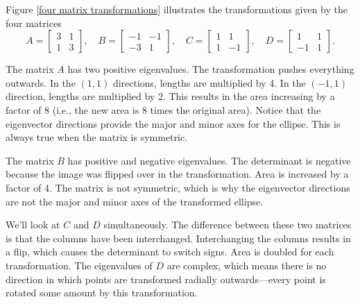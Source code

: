 \begin{example}\label{details for four}

Figure \ref{four matrix transformations} illustrates the transformations given by  the four matrices 
$$A = 
\begin{bmatrix}
3&1\\1&3
\end{bmatrix}
,\quad
B = 
\begin{bmatrix}
-1&-1\\-3&1
\end{bmatrix}
,\quad
C = 
\begin{bmatrix}
1&1\\1&-1
\end{bmatrix}
,\quad
D = 
\begin{bmatrix}
1&1\\-1&1
\end{bmatrix}
.$$ 

The matrix $A$ has two positive eigenvalues. The transformation pushes everything outwards.  In the $(1,1)$ directions, lengths are multiplied by 4.  In the $(-1,1)$ direction, lengths are multiplied by 2.  This results in the area increasing by a factor of 8 (i.e., the new area is 8 times the original area).  Notice that the eigenvector directions provide the major and minor axes for the ellipse.  This is always true when the matrix is symmetric.

The matrix $B$ has positive and negative eigenvalues.  The determinant is negative because the image was flipped over in the transformation.  Area is increased by a factor of 4.  The matrix is not symmetric, which is why the eigenvector directions are not the major and minor axes of the transformed ellipse.

We'll look at $C$ and $D$ simultaneously.  The difference between these two matrices is that the columns have been interchanged. Interchanging the columns results in a flip, which causes the determinant to switch signs. Area is doubled for each transformation.  The eigenvalues of $D$ are complex, which means there is no direction in which points are transformed radially outwards---every point is rotated some amount by this transformation.      

\newcommand{\myvfplotheight}{1.8in}
\begin{figure}
\begin{tikzpicture}


\end{tikzpicture}
\end{figure}
\end{example}
